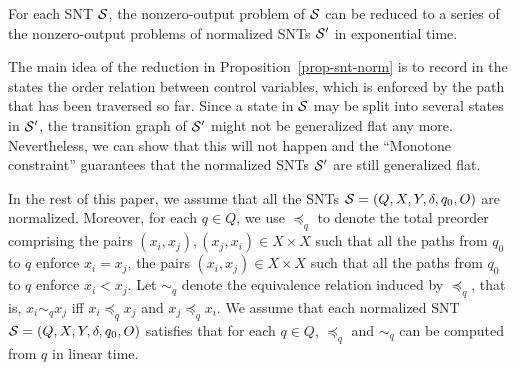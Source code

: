 \begin{proposition}\label{prop-snt-norm}
For each SNT ${\mathcal{S} }$, the nonzero-output problem of ${\mathcal{S} }$ can be reduced to a series of the nonzero-output problems of normalized SNTs ${\mathcal{S} }'$ in exponential time.
\end{proposition}

The main idea of the reduction in Proposition~\ref{prop-snt-norm} is to record in the states the order relation between control variables, which is enforced by the path that has been traversed so far. Since a state in ${\mathcal{S} }$ may be split into several states in ${\mathcal{S} }'$, the transition graph of ${\mathcal{S} }'$ might not be generalized flat any more. Nevertheless, we can show that this will not happen and the ``Monotone  constraint'' guarantees that the normalized SNTs ${\mathcal{S} }'$ are still generalized flat. 

In the rest of this paper, we assume that all the SNTs ${\mathcal{S} }=(Q, X, Y, \delta, q_0, O)$  are normalized. Moreover, for each $q \in Q$, we use $\preceq_q$ to denote the total preorder comprising the pairs $(x_i, x_j), (x_j, x_i) \in X \times X$ such that all the paths from $q_0$ to $q$ enforce $x_i = x_j$, the pairs $ (x_i, x_j)  \in X \times X$ such that all the paths from $q_0$ to $q$ enforce $x_i < x_j$. Let $\sim_q$ denote the equivalence relation induced by $\preceq_q$, that is, $x_i \sim_q x_j$ iff $x_i \preceq_q x_j$ and $x_j \preceq_q x_i$. We assume that each normalized SNT ${\mathcal{S} }=(Q, X, Y, \delta, q_0, O)$ satisfies that for each $q \in Q$, $\preceq_q$ and $\sim_q$ can be computed from $q$ in linear time.

